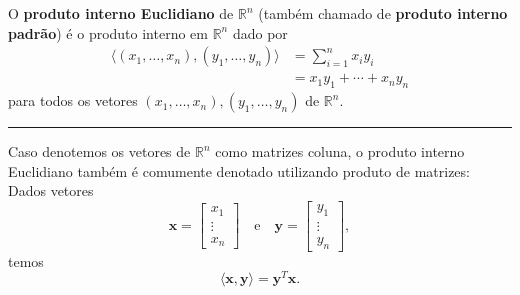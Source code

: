 \begin{definition}
	O \textbf{produto interno Euclidiano} de $\mathbb{R}^n$ (também chamado de \textbf{produto interno padrão}) é o produto interno em $\mathbb{R}^n$ dado por
	\begin{align*}
		\langle (x_1,\ldots,x_n),(y_1,\ldots,y_n)\rangle
			&=\sum_{i=1}^n x_iy_i\\
			&=x_1y_1+\cdots+x_ny_n
	\end{align*}
	para todos os vetores $(x_1,\ldots,x_n),(y_1,\ldots,y_n)$ de $\mathbb{R}^n$.
	
	\hrule
	
	Caso denotemos os vetores de $\mathbb{R}^n$ como matrizes coluna, o produto interno Euclidiano também é comumente denotado utilizando produto de matrizes: Dados vetores
	\[\mathbf{x}=\begin{bmatrix}x_1\\\vdots\\x_n\end{bmatrix}\quad\text{e}\quad\mathbf{y}=\begin{bmatrix}y_1\\\vdots\\y_n\end{bmatrix},\]
	temos
	\[\langle\mathbf{x},\mathbf{y}\rangle=\mathbf{y}^T\mathbf{x}.\]
\end{definition}